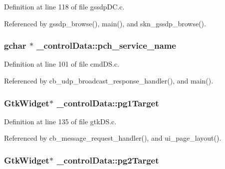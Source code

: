 Definition at line 118 of file gssdp\+D\+C.\+c.



Referenced by gssdp\+\_\+browse(), main(), and skn\+\_\+gssdp\+\_\+browse().

\hypertarget{struct__control_data_a2197fd3d9315510193866dbedbd3cc8b}{
\subsubsection[{pch\+\_\+service\+\_\+name}]{\setlength{\rightskip}{0pt plus 5cm}gchar $\ast$ \+\_\+control\+Data\+::pch\+\_\+service\+\_\+name}}\label{struct__control_data_a2197fd3d9315510193866dbedbd3cc8b}


Definition at line 101 of file cmd\+D\+S.\+c.



Referenced by cb\+\_\+udp\+\_\+broadcast\+\_\+response\+\_\+handler(), and main().

\hypertarget{struct__control_data_adb6c2830054c6309779d676082e94447}{
\subsubsection[{pg1\+Target}]{\setlength{\rightskip}{0pt plus 5cm}Gtk\+Widget$\ast$ \+\_\+control\+Data\+::pg1\+Target}}\label{struct__control_data_adb6c2830054c6309779d676082e94447}


Definition at line 135 of file gtk\+D\+S.\+c.



Referenced by cb\+\_\+message\+\_\+request\+\_\+handler(), and ui\+\_\+page\+\_\+layout().

\hypertarget{struct__control_data_a201f826ab99699df83a85c5e4572ffb2}{
\subsubsection[{pg2\+Target}]{\setlength{\rightskip}{0pt plus 5cm}Gtk\+Widget$\ast$ \+\_\+control\+Data\+::pg2\+Target}}\label{struct__control_data_a201f826ab99699df83a85c5e4572ffb2}



